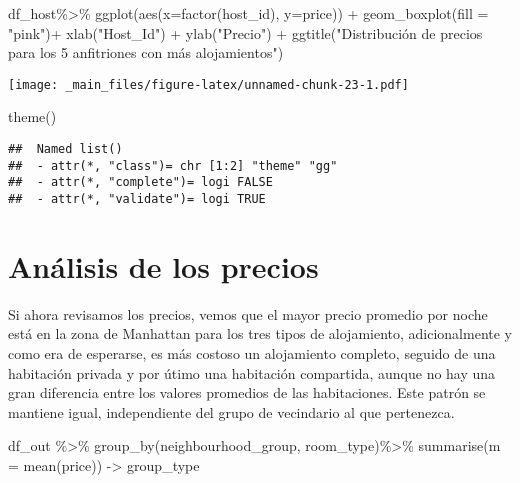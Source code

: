 \documentclass[
]{book}
\newenvironment{Shaded}{\begin{snugshade}}{\end{snugshade}}
\newcommand{\AttributeTok}[1]{\textcolor[rgb]{0.77,0.63,0.00}{#1}}
\newcommand{\FunctionTok}[1]{\textcolor[rgb]{0.00,0.00,0.00}{#1}}
\newcommand{\NormalTok}[1]{#1}
\newcommand{\OtherTok}[1]{\textcolor[rgb]{0.56,0.35,0.01}{#1}}
\newcommand{\SpecialCharTok}[1]{\textcolor[rgb]{0.00,0.00,0.00}{#1}}
\newcommand{\StringTok}[1]{\textcolor[rgb]{0.31,0.60,0.02}{#1}}
\begin{document}
\begin{Shaded}
\begin{Highlighting}[]
\NormalTok{df\_host}\SpecialCharTok{\%\textgreater{}\%}
  \FunctionTok{ggplot}\NormalTok{(}\FunctionTok{aes}\NormalTok{(}\AttributeTok{x=}\FunctionTok{factor}\NormalTok{(host\_id), }\AttributeTok{y=}\NormalTok{price)) }\SpecialCharTok{+} 
  \FunctionTok{geom\_boxplot}\NormalTok{(}\AttributeTok{fill =} \StringTok{"pink"}\NormalTok{)}\SpecialCharTok{+}
  \FunctionTok{xlab}\NormalTok{(}\StringTok{"Host\_Id"}\NormalTok{) }\SpecialCharTok{+} \FunctionTok{ylab}\NormalTok{(}\StringTok{"Precio"}\NormalTok{) }\SpecialCharTok{+}
  \FunctionTok{ggtitle}\NormalTok{(}\StringTok{"Distribución de precios para los 5 anfitriones con más alojamientos"}\NormalTok{)}
\end{Highlighting}
\end{Shaded}

\texttt{[image: \_main\_files/figure-latex/unnamed-chunk-23-1.pdf]}

\begin{Shaded}
\begin{Highlighting}[]
  \FunctionTok{theme}\NormalTok{()}
\end{Highlighting}
\end{Shaded}

\begin{verbatim}
##  Named list()
##  - attr(*, "class")= chr [1:2] "theme" "gg"
##  - attr(*, "complete")= logi FALSE
##  - attr(*, "validate")= logi TRUE
\end{verbatim}

\hypertarget{anuxe1lisis-de-los-precios}{%
\section*{Análisis de los precios}\label{anuxe1lisis-de-los-precios}}

Si ahora revisamos los precios, vemos que el mayor precio promedio por noche está en la zona de Manhattan para los tres tipos de alojamiento, adicionalmente y como era de esperarse, es más costoso un alojamiento completo, seguido de una habitación privada y por útimo una habitación compartida, aunque no hay una gran diferencia entre los valores promedios de las habitaciones. Este patrón se mantiene igual, independiente del grupo de vecindario al que pertenezca.

\begin{Shaded}
\begin{Highlighting}[]
\NormalTok{df\_out }\SpecialCharTok{\%\textgreater{}\%}
  \FunctionTok{group\_by}\NormalTok{(neighbourhood\_group, room\_type)}\SpecialCharTok{\%\textgreater{}\%}
  \FunctionTok{summarise}\NormalTok{(}\AttributeTok{m =} \FunctionTok{mean}\NormalTok{(price)) }\OtherTok{{-}\textgreater{}}\NormalTok{ group\_type}
\end{Highlighting}
\end{Shaded}
\end{document}
